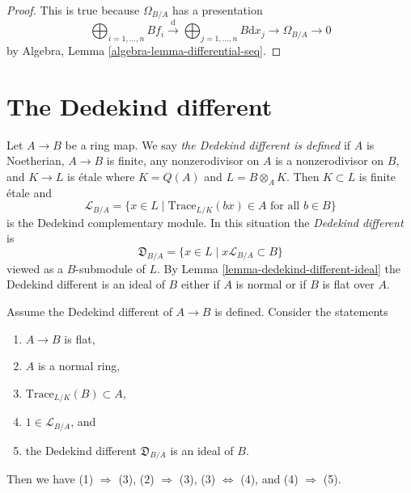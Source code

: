 \begin{proof}
This is true because $\Omega_{B/A}$ has a presentation
$$
\bigoplus\nolimits_{i = 1, \ldots, n} B f_i
\xrightarrow{\text{d}}
\bigoplus\nolimits_{j = 1, \ldots, n} B \text{d}x_j
\rightarrow \Omega_{B/A} \rightarrow 0
$$
by Algebra, Lemma \ref{algebra-lemma-differential-seq}.
\end{proof}



\section{The Dedekind different}
\label{section-dedekind-different}

\noindent
Let $A \to B$ be a ring map. We say {\it the Dedekind different is defined}
if $A$ is Noetherian, $A \to B$ is finite,
any nonzerodivisor on $A$ is a nonzerodivisor on $B$, and $K \to L$ is
\'etale where $K = Q(A)$ and $L = B \otimes_A K$. Then $K \subset L$ is
finite \'etale and
$$
\mathcal{L}_{B/A} = \{x \in L \mid \text{Trace}_{L/K}(bx) \in A
\text{ for all }b \in B\}
$$
is the Dedekind complementary module. In this situation the
{\it Dedekind different} is
$$
\mathfrak{D}_{B/A} = \{x \in L \mid x\mathcal{L}_{B/A} \subset B\}
$$
viewed as a $B$-submodule of $L$.
By Lemma \ref{lemma-dedekind-different-ideal} the Dedekind different is an
ideal of $B$ either if $A$ is normal or if $B$ is flat over $A$.

\begin{lemma}
\label{lemma-dedekind-different-ideal}
Assume the Dedekind different of $A \to B$ is defined. Consider the statements
\begin{enumerate}
\item $A \to B$ is flat,
\item $A$ is a normal ring,
\item $\text{Trace}_{L/K}(B) \subset A$,
\item $1 \in \mathcal{L}_{B/A}$, and
\item the Dedekind different $\mathfrak{D}_{B/A}$ is an ideal of $B$.
\end{enumerate}
Then we have (1) $\Rightarrow$ (3), (2) $\Rightarrow$ (3),
(3) $\Leftrightarrow$ (4), and (4) $\Rightarrow$ (5).
\end{lemma}

